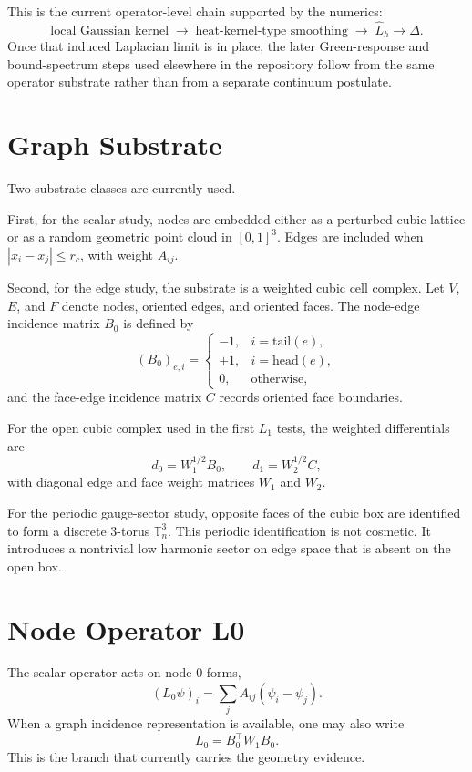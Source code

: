 \documentclass[11pt]{article}
\begin{document}
This is the current operator-level chain supported by the numerics:
\begin{equation}
\text{local Gaussian kernel}
\;\to\;
\text{heat-kernel-type smoothing}
\;\to\;
\widehat{L}_h \to \Delta.
\end{equation}
Once that induced Laplacian limit is in place, the later Green-response and bound-spectrum steps used elsewhere in the repository follow from the same operator substrate rather than from a separate continuum postulate.

\section{Graph Substrate}
Two substrate classes are currently used.

First, for the scalar study, nodes are embedded either as a perturbed cubic lattice or as a random geometric point cloud in $[0,1]^3$. Edges are included when $|x_i-x_j| \le r_c$, with weight $A_{ij}$.

Second, for the edge study, the substrate is a weighted cubic cell complex. Let $V$, $E$, and $F$ denote nodes, oriented edges, and oriented faces. The node-edge incidence matrix $B_0$ is defined by
\begin{equation}
(B_0)_{e,i} =
\begin{cases}
-1, & i = \mathrm{tail}(e), \\
+1, & i = \mathrm{head}(e), \\
0, & \text{otherwise},
\end{cases}
\end{equation}
and the face-edge incidence matrix $C$ records oriented face boundaries.

For the open cubic complex used in the first $L_1$ tests, the weighted differentials are
\begin{equation}
d_0 = W_1^{1/2} B_0,
\qquad
d_1 = W_2^{1/2} C,
\end{equation}
with diagonal edge and face weight matrices $W_1$ and $W_2$.

For the periodic gauge-sector study, opposite faces of the cubic box are identified to form a discrete $3$-torus $\mathbb{T}^3_n$. This periodic identification is not cosmetic. It introduces a nontrivial low harmonic sector on edge space that is absent on the open box.

\section{Node Operator L0}
The scalar operator acts on node $0$-forms,
\begin{equation}
(L_0 \psi)_i = \sum_j A_{ij}(\psi_i-\psi_j).
\end{equation}
When a graph incidence representation is available, one may also write
\begin{equation}
L_0 = B_0^\top W_1 B_0.
\end{equation}
This is the branch that currently carries the geometry evidence.
\end{document}
